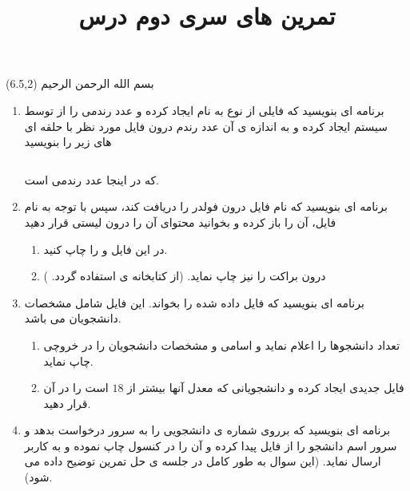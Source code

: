 \documentclass[oneside]{article}
\title{تمرین های سری دوم درس
\lr{Service Based Architecture}
}
\date{\vspace{-5ex}}
\newcommand{\inputcode}[2]{\inputminted[mathescape,%
                                                 linenos=true,%
                                                 formatcom=\small\setstretch{1}]{#1}{#2}}%
\begin{document}
\maketitle

\begin{textblock}{5}(6.5,2)\nastaliqfont
\noindent\Large
بسم الله الرحمن الرحیم
\end{textblock}

\begin{enumerate}
\item
برنامه ای بنویسید که فایلی از نوع 
به نام 
ایجاد کرده و
عدد رندمی را از توسط سیستم ایجاد کرده و به اندازه ی آن عدد رندم 
 درون فایل مورد نظر با حلقه ای 
های 
 زیر را بنویسید 
\begin{latin}\inputcode{Text}{q1.txt}\end{latin}
که در اینجا
عدد رندمی است.
\item 
برنامه ای بنویسید که 
نام فایل درون فولدر 
را دریافت کند، سپس با توجه به نام فایل، آن را باز کرده و بخوانید محتوای آن را درون لیستی قرار دهید
\begin{enumerate}
\item 
در این فایل 
و 
را چاپ کنید.
\item
{}
درون 
براکت را نیز چاپ نماید.
(از کتابخانه ی
استفاده گردد.
)

\end{enumerate}
\item 
برنامه ای بنویسید که
فایل
داده شده را بخواند.
این فایل شامل مشخصات دانشجویان می باشد. 
\begin{enumerate}
\item
 تعداد دانشجوها را اعلام نماید و 
 اسامی و مشخصات دانشجویان را در خروچی چاپ نماید.
 \item
 فایل 
 جدیدی ایجاد کرده و دانشجویانی که معدل آنها بیشتر از 
 $18$
 است را در آن قرار دهید. 
\end{enumerate}
\item 
برنامه ای بنویسید که
برروی
شماره ی دانشجویی را به سرور درخواست بدهد
و سرور اسم دانشجو را 
از فایل 
پیدا کرده و آن را در کنسول چاپ نموده و
به کاربر ارسال نماید.
(این سوال به طور کامل در جلسه ی حل تمرین توضیح داده می شود).


\end{enumerate}

\end{document}
